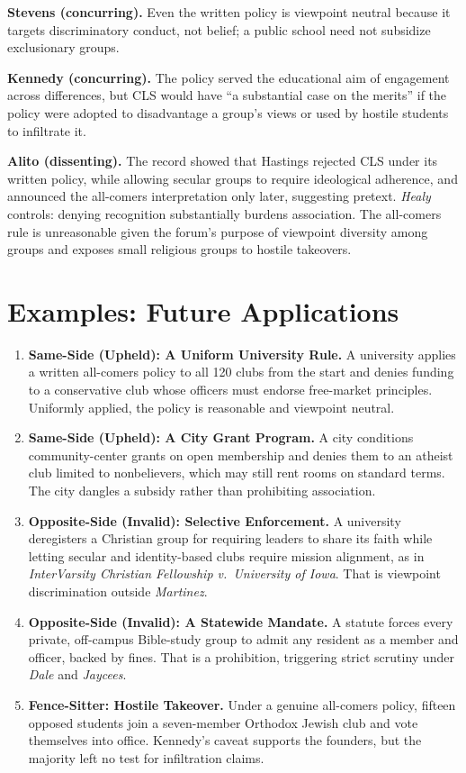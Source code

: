 \documentclass[12pt]{article}
\begin{document}
\textbf{Stevens (concurring).} Even the written policy is viewpoint neutral because it targets discriminatory conduct, not belief; a public school need not subsidize exclusionary groups.

\textbf{Kennedy (concurring).} The policy served the educational aim of engagement across differences, but CLS would have ``a substantial case on the merits'' if the policy were adopted to disadvantage a group's views or used by hostile students to infiltrate it.

\textbf{Alito (dissenting).} The record showed that Hastings rejected CLS under its written policy, while allowing secular groups to require ideological adherence, and announced the all-comers interpretation only later, suggesting pretext. \textit{Healy} controls: denying recognition substantially burdens association. The all-comers rule is unreasonable given the forum's purpose of viewpoint diversity among groups and exposes small religious groups to hostile takeovers.

\section{Examples: Future Applications}

\begin{enumerate}
\item \textbf{Same-Side (Upheld): A Uniform University Rule.} A university applies a written all-comers policy to all 120 clubs from the start and denies funding to a conservative club whose officers must endorse free-market principles. Uniformly applied, the policy is reasonable and viewpoint neutral.
\item \textbf{Same-Side (Upheld): A City Grant Program.} A city conditions community-center grants on open membership and denies them to an atheist club limited to nonbelievers, which may still rent rooms on standard terms. The city dangles a subsidy rather than prohibiting association.
\item \textbf{Opposite-Side (Invalid): Selective Enforcement.} A university deregisters a Christian group for requiring leaders to share its faith while letting secular and identity-based clubs require mission alignment, as in \textit{InterVarsity Christian Fellowship v.\ University of Iowa}. That is viewpoint discrimination outside \textit{Martinez}.
\item \textbf{Opposite-Side (Invalid): A Statewide Mandate.} A statute forces every private, off-campus Bible-study group to admit any resident as a member and officer, backed by fines. That is a prohibition, triggering strict scrutiny under \textit{Dale} and \textit{Jaycees}.
\item \textbf{Fence-Sitter: Hostile Takeover.} Under a genuine all-comers policy, fifteen opposed students join a seven-member Orthodox Jewish club and vote themselves into office. Kennedy's caveat supports the founders, but the majority left no test for infiltration claims.
\end{enumerate}
\end{document}
